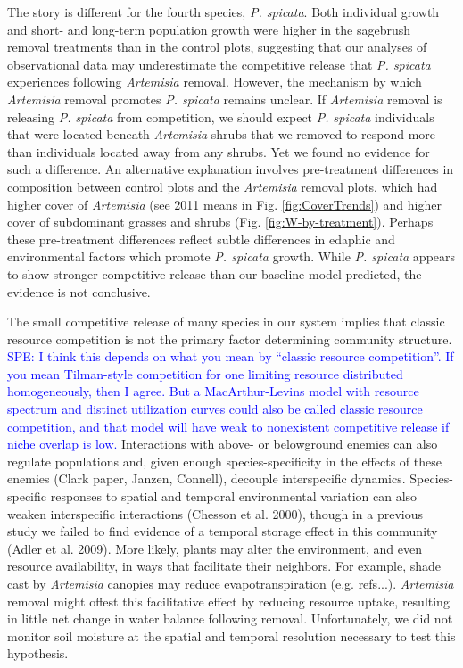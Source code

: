 \documentclass[11pt]{article}
\newcommand{\comment}{\textcolor{blue}}
\begin{document}
\begin{doublespacing}
The story is different for the fourth species, \textit{P. spicata}. Both individual growth and short- and long-term population growth were higher in the sagebrush removal treatments than in the control plots, suggesting that our analyses of observational data may underestimate the competitive release that \textit{P. spicata} experiences following \textit{Artemisia} removal. However, the mechanism by which \textit{Artemisia} removal promotes \textit{P. spicata} remains unclear. If  \textit{Artemisia} removal is releasing \textit{P. spicata} from competition, we should expect \textit{P. spicata} individuals that were located beneath \textit{Artemisia} shrubs that we removed to respond more than individuals located away from any shrubs. Yet we found no evidence for such a difference. An alternative explanation involves pre-treatment differences in composition between control plots and  the \textit{Artemisia} removal  plots, which had higher cover of \textit{Artemisia} (see 2011 means in Fig. \ref{fig:CoverTrends}) and higher cover of subdominant grasses and shrubs (Fig. \ref{fig:W-by-treatment}). Perhaps these pre-treatment differences reflect subtle differences in edaphic and environmental factors which promote \textit{P. spicata} growth. While \textit{P. spicata} appears to show stronger competitive release than our baseline model predicted, the evidence is not conclusive. 

The small competitive release of many species in our system implies that classic resource competition 
is not the primary factor determining community structure. 
\comment{SPE: I think this depends on what you mean by ``classic resource competition''. If you mean Tilman-style competition for one limiting resource distributed homogeneously, then I agree. But a MacArthur-Levins model with resource spectrum and distinct utilization curves could also be called classic resource competition,
and that model will have weak to nonexistent competitive release if niche overlap is low.} 
Interactions with above- or belowground enemies can also regulate populations and, given enough species-specificity in the effects of these enemies (Clark paper, Janzen, Connell), decouple interspecific dynamics. Species-specific responses to spatial and temporal environmental variation can also weaken interspecific interactions (Chesson et al. 2000), though in a previous study we failed to find evidence of a temporal storage effect in this community (Adler et al. 2009). More likely, plants may alter the environment, and even resource availability, in ways that facilitate their neighbors. For example, shade cast by \textit{Artemisia} canopies may reduce evapotranspiration (e.g. refs...). \textit{Artemisia} removal might offest this facilitative effect by reducing resource uptake, resulting in little net change in water balance following removal.  Unfortunately, we did not monitor soil moisture at the spatial and temporal resolution necessary to test this hypothesis.


\end{doublespacing}
\end{document}
